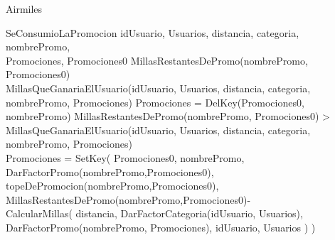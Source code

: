 \documentclass[11pt,a4paper]{article}
\begin{document}
\begin{tad}{Airmiles}
    \vspace{1cm}

    
    \predLargo
    {SeConsumioLaPromocion}
    {
        idUsuario,
        Usuarios,
        distancia,
        categoria,
        nombrePromo, \\
        Promociones,
        Promociones0
    }
    {
        MillasRestantesDePromo(nombrePromo, Promociones0) \leq \\
        MillasQueGanariaElUsuario(idUsuario, Usuarios, distancia, categoria, \\ nombrePromo, Promociones)
        \implica
        Promociones = DelKey(Promociones0, nombrePromo)
        \land
        MillasRestantesDePromo(nombrePromo, Promociones0) > \\
        MillasQueGanariaElUsuario(idUsuario, Usuarios, distancia, categoria, \\ 
        nombrePromo, Promociones)
        \implica \\
        Promociones = SetKey(
            Promociones0,
            nombrePromo, \\
            \lbrack
                DarFactorPromo(nombrePromo,Promociones0), \\
                topeDePromocion(nombrePromo,Promociones0), \\
                MillasRestantesDePromo(nombrePromo,Promociones0)- \\
                CalcularMillas(
                    distancia,
                    DarFactorCategoria(idUsuario, Usuarios), \\
                    DarFactorPromo(nombrePromo, Promociones),
                    idUsuario,
                    Usuarios
                )
            \rbrack
        )
    }






\end{tad}
\end{document}
